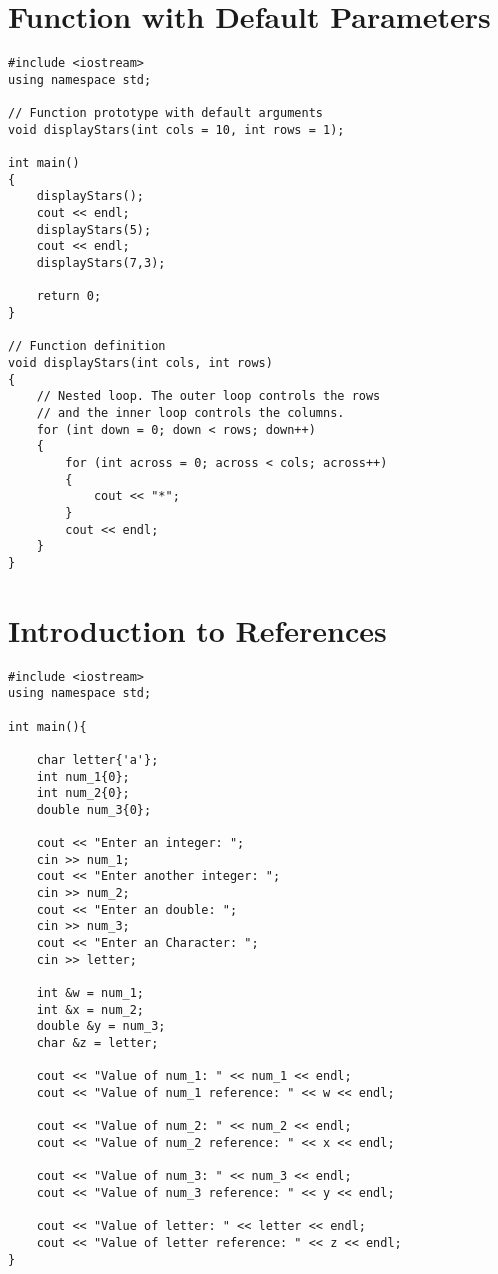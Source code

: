 \documentclass[12pt]{article}
\begin{document}
\section*{Function with Default Parameters}
\begin{verbatim}
#include <iostream>
using namespace std;

// Function prototype with default arguments
void displayStars(int cols = 10, int rows = 1);

int main()
{
    displayStars();
    cout << endl;
    displayStars(5);
    cout << endl;
    displayStars(7,3);

    return 0;
}

// Function definition
void displayStars(int cols, int rows)
{
    // Nested loop. The outer loop controls the rows
    // and the inner loop controls the columns.
    for (int down = 0; down < rows; down++)
    {
        for (int across = 0; across < cols; across++)
        {
            cout << "*";
        }
        cout << endl;
    }
}

\end{verbatim}


\section*{Introduction to References}
\begin{verbatim}
#include <iostream>
using namespace std;

int main(){

    char letter{'a'};
    int num_1{0};
    int num_2{0};
    double num_3{0};

    cout << "Enter an integer: ";
    cin >> num_1;
    cout << "Enter another integer: ";
    cin >> num_2;
    cout << "Enter an double: ";
    cin >> num_3;
    cout << "Enter an Character: ";
    cin >> letter;

    int &w = num_1;
    int &x = num_2;
    double &y = num_3;
    char &z = letter;

    cout << "Value of num_1: " << num_1 << endl;
    cout << "Value of num_1 reference: " << w << endl; 

    cout << "Value of num_2: " << num_2 << endl; 
    cout << "Value of num_2 reference: " << x << endl; 

    cout << "Value of num_3: " << num_3 << endl; 
    cout << "Value of num_3 reference: " << y << endl;

    cout << "Value of letter: " << letter << endl; 
    cout << "Value of letter reference: " << z << endl; 
}
\end{verbatim}
\end{document}

